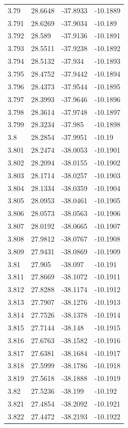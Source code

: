 \begin{tabular}{llll}
3.79 & 28.6648 & -37.8933 & -10.1889 \\
3.791 & 28.6269 & -37.9034 & -10.189 \\
3.792 & 28.589 & -37.9136 & -10.1891 \\
3.793 & 28.5511 & -37.9238 & -10.1892 \\
3.794 & 28.5132 & -37.934 & -10.1893 \\
3.795 & 28.4752 & -37.9442 & -10.1894 \\
3.796 & 28.4373 & -37.9544 & -10.1895 \\
3.797 & 28.3993 & -37.9646 & -10.1896 \\
3.798 & 28.3614 & -37.9748 & -10.1897 \\
3.799 & 28.3234 & -37.985 & -10.1898 \\
3.8 & 28.2854 & -37.9951 & -10.19 \\
3.801 & 28.2474 & -38.0053 & -10.1901 \\
3.802 & 28.2094 & -38.0155 & -10.1902 \\
3.803 & 28.1714 & -38.0257 & -10.1903 \\
3.804 & 28.1334 & -38.0359 & -10.1904 \\
3.805 & 28.0953 & -38.0461 & -10.1905 \\
3.806 & 28.0573 & -38.0563 & -10.1906 \\
3.807 & 28.0192 & -38.0665 & -10.1907 \\
3.808 & 27.9812 & -38.0767 & -10.1908 \\
3.809 & 27.9431 & -38.0869 & -10.1909 \\
3.81 & 27.905 & -38.097 & -10.191 \\
3.811 & 27.8669 & -38.1072 & -10.1911 \\
3.812 & 27.8288 & -38.1174 & -10.1912 \\
3.813 & 27.7907 & -38.1276 & -10.1913 \\
3.814 & 27.7526 & -38.1378 & -10.1914 \\
3.815 & 27.7144 & -38.148 & -10.1915 \\
3.816 & 27.6763 & -38.1582 & -10.1916 \\
3.817 & 27.6381 & -38.1684 & -10.1917 \\
3.818 & 27.5999 & -38.1786 & -10.1918 \\
3.819 & 27.5618 & -38.1888 & -10.1919 \\
3.82 & 27.5236 & -38.199 & -10.192 \\
3.821 & 27.4854 & -38.2092 & -10.1921 \\
3.822 & 27.4472 & -38.2193 & -10.1922 \\

\end{tabular}
